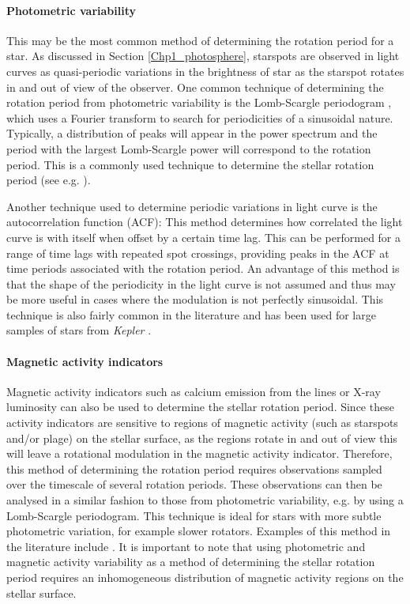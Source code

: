 \paragraph{Photometric variability}
This may be the most common method of determining the rotation period for a star. As discussed in Section \ref{Chp1_photosphere}, starspots are observed in light curves as quasi-periodic variations in the brightness of star as the starspot rotates in and out of view of the observer. One common technique of determining the rotation period from photometric variability is the Lomb-Scargle periodogram \citep{Lomb_1976,Scargle_1982}, which uses a Fourier transform to search for periodicities of a sinusoidal nature. Typically, a distribution of peaks will appear in the power spectrum and the period with the largest Lomb-Scargle power will correspond to the rotation period. This is a commonly used technique to determine the stellar rotation period (see e.g. \citealt{do_Nascimento_etal_2014,Nielsen_etal_2013}).

Another technique used to determine periodic variations in light curve is the autocorrelation function (ACF): This method determines how correlated the light curve is with itself when offset by a certain time lag. This can be performed for a range of time lags with repeated spot crossings, providing peaks in the ACF at time periods associated with the rotation period. An advantage of this method is that the shape of the periodicity in the light curve is not assumed and thus may be more useful in cases where the modulation is not perfectly sinusoidal. This technique is also fairly common in the literature and has been used for large samples of stars from \textit{Kepler} \citep{McQuillan_etal_2014}.

\paragraph{Magnetic activity indicators}
Magnetic activity indicators such as calcium emission from the \caII lines or X-ray luminosity can also be used to determine the stellar rotation period. Since these activity indicators are sensitive to regions of magnetic activity (such as starspots and/or plage) on the stellar surface, as the regions rotate in and out of view this will leave a rotational modulation in the magnetic activity indicator. Therefore, this method of determining the rotation period requires observations sampled over the timescale of several rotation periods. These observations can then be analysed in a similar fashion to those from photometric variability, e.g. by using a Lomb-Scargle periodogram. This technique is ideal for stars with more subtle photometric variation, for example slower rotators. Examples of this method in the literature include \citet{DeWarf_etal_2010,Robertson_etal_2015_GJ176,Boro_Saikia_etal_2016,Hempelmann_etal_2016}. It is important to note that using photometric and magnetic activity variability as a method of determining the stellar rotation period requires an inhomogeneous distribution of magnetic activity regions on the stellar surface.

